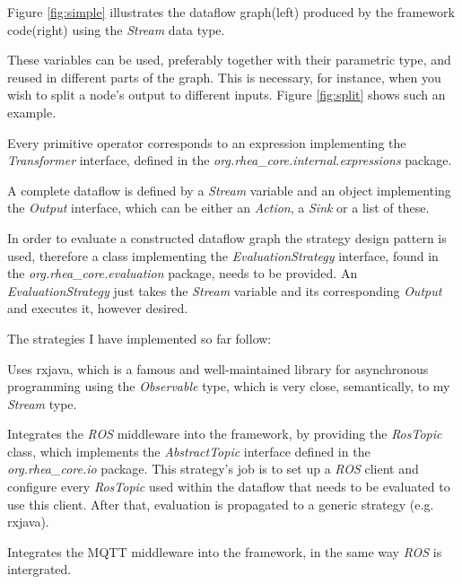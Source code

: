 \documentclass{dithesis}
\begin{document}
Figure \ref{fig:simple} illustrates the dataflow graph(left) produced by the framework code(right) using the \textit{Stream} data type.


These variables can be used, preferably together with their parametric type, and reused in different parts of the graph. This is necessary, for instance, when you wish to split a node's output to different inputs. Figure \ref{fig:split} shows such an example.




Every primitive operator corresponds to an expression implementing the \textit{Transformer} interface, defined in the \textit{org.rhea\_core.internal.expressions} package. 

A complete dataflow is defined by a \textit{Stream} variable and an object implementing the \textit{Output} interface, which can be either an \textit{Action}, a \textit{Sink} or a list of these. 

In order to evaluate a constructed dataflow graph the strategy design pattern is used, therefore a class implementing the \textit{EvaluationStrategy} interface, found in the \textit{org.rhea\_core.evaluation} package, needs to be provided. An \textit{EvaluationStrategy} just takes the \textit{Stream} variable and its corresponding \textit{Output} and executes it, however desired.

The strategies I have implemented so far follow:

\begin{description}[style=nextline]
\item[RxJavaEvaluationStrategy\site{https://github.com/rhea-flow/rx-eval}] 
Uses rxjava, which is a famous and well-maintained library for asynchronous programming using the \textit{Observable} type, which is very close, semantically, to my \textit{Stream} type.

\item[RosEvaluationStrategy\site{https://github.com/rhea-flow/ros-eval}] 
Integrates the \textit{ROS} middleware into the framework, by providing the \textit{RosTopic} class, which implements the \textit{AbstractTopic} interface defined in the \textit{org.rhea\_core.io} package. This strategy's job is to set up a \textit{ROS} client and configure every \textit{RosTopic} used within the dataflow that needs to be evaluated to use this client. After that, evaluation is propagated to a generic strategy (e.g. rxjava).

\item[MqttEvaluationStrategy\site{https://github.com/rhea-flow/mqtt-eval}] 
Integrates the MQTT middleware into the framework, in the same way \textit{ROS} is intergrated.
\end{description}
\end{document}

